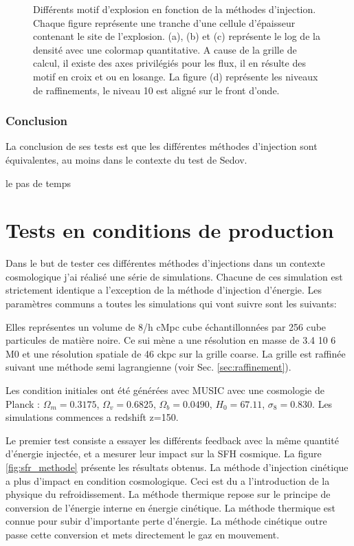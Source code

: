 \begin{figure}[htpb]
    \caption{Différents motif d'explosion en fonction de la méthodes d'injection.
    Chaque figure représente une tranche d'une cellule d'épaisseur contenant le site de l'explosion.
    (a), (b) et (c) représente le log de la densité avec une colormap quantitative.
    A cause de la grille de calcul, il existe des axes privilégiés pour les flux, il en résulte des motif en croix et ou en losange.
    La figure (d) représente les niveaux de raffinements, le niveau 10 est aligné sur le front d'onde.
    }
 	\label{fig:sedovslice}
\end{figure}



\subsubsection{Conclusion}

La conclusion de ses tests est que les différentes méthodes d'injection sont équivalentes, au moins dans le contexte du test de Sedov.


le pas de temps\\


\section{Tests en conditions de production}

Dans le but de tester ces différentes méthodes d'injections dans un contexte cosmologique j'ai réalisé une série de simulations.
Chacune de ces simulation est strictement identique a l'exception de la méthode d'injection d'énergie.
Les paramètres communs a toutes les simulations qui vont suivre sont les suivants:

Elles représentes un volume de 8/h cMpc cube échantillonnées par 256 cube particules de matière noire.
Ce sui mène a une résolution en masse de 3.4 10 6 M0 et une résolution spatiale de 46 ckpc sur la grille coarse.
La grille est raffinée suivant une méthode semi lagrangienne (voir Sec. \ref{sec:raffinement}).

Les condition initiales ont été générées avec MUSIC avec une cosmologie de Planck \citep{planck_collaboration_planck_2016} : 
$\Omega_m=0.3175$, 
$\Omega_v=0.6825$,
$\Omega_b=0.0490$,
$H_0=67.11$,
$\sigma_8=0.830$. 
Les simulations commences a redshift z=150.


Le premier test consiste a essayer les différents feedback avec la même quantité d'énergie injectée, et a mesurer leur impact sur la SFH cosmique.
La figure \ref{fig:sfr_methode} présente les résultats obtenus.
La méthode d'injection cinétique a plus d'impact en condition cosmologique.
Ceci est du a l'introduction de la physique du refroidissement.
La méthode thermique repose sur le principe de conversion de l'énergie interne en énergie cinétique.
La méthode thermique est connue %
pour subir d'importante perte d'énergie.
La méthode cinétique outre passe cette conversion et mets directement le gaz en mouvement.

